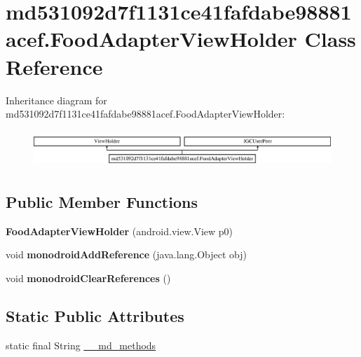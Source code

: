 \hypertarget{classmd531092d7f1131ce41fafdabe98881acef_1_1_food_adapter_view_holder}{}\section{md531092d7f1131ce41fafdabe98881acef.\+Food\+Adapter\+View\+Holder Class Reference}
\label{classmd531092d7f1131ce41fafdabe98881acef_1_1_food_adapter_view_holder}
Inheritance diagram for md531092d7f1131ce41fafdabe98881acef.\+Food\+Adapter\+View\+Holder\+:\begin{figure}[H]
\begin{center}
\leavevmode
\includegraphics[height=1.403509cm]{classmd531092d7f1131ce41fafdabe98881acef_1_1_food_adapter_view_holder}
\end{center}
\end{figure}
\subsection*{Public Member Functions}
\begin{DoxyCompactItemize}
\item 
\mbox{\label{classmd531092d7f1131ce41fafdabe98881acef_1_1_food_adapter_view_holder_aeb05614bf5ca2a46bc3f47ff177726d3}} 
{\bfseries Food\+Adapter\+View\+Holder} (android.\+view.\+View p0)
\item 
\mbox{\label{classmd531092d7f1131ce41fafdabe98881acef_1_1_food_adapter_view_holder_a87db8592eb19893403ef825a58c9d925}} 
void {\bfseries monodroid\+Add\+Reference} (java.\+lang.\+Object obj)
\item 
\mbox{\label{classmd531092d7f1131ce41fafdabe98881acef_1_1_food_adapter_view_holder_a5e0347e0d7d94ab1b3dfc2bd4dbcea2c}} 
void {\bfseries monodroid\+Clear\+References} ()
\end{DoxyCompactItemize}
\subsection*{Static Public Attributes}
\begin{DoxyCompactItemize}
\item 
static final String \hyperlink{classmd531092d7f1131ce41fafdabe98881acef_1_1_food_adapter_view_holder_aadc4e0e7bdad48c8f4d3393d0986a3a4}{\+\_\+\+\_\+md\+\_\+methods}
\end{DoxyCompactItemize}


